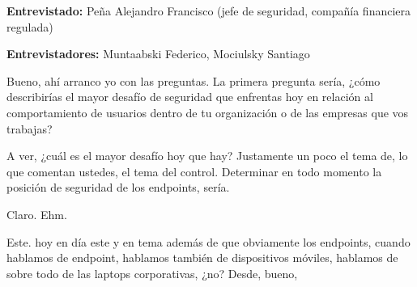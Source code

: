 
\textbf{Entrevistado:} Peña Alejandro Francisco (jefe de seguridad, compañía financiera regulada)

\textbf{Entrevistadores:} Muntaabski Federico, Mociulsky Santiago

\begin{description}[leftmargin=0cm, labelsep=0.5cm]
    \item[\textbf{MUNTAABSKI FEDERICO:}] Bueno, ahí arranco yo con las preguntas. La primera pregunta sería, ¿cómo describirías el mayor desafío de seguridad que enfrentas hoy en relación al comportamiento de usuarios dentro de tu organización o de las empresas que vos trabajas?

    \item[\textbf{PEÑA ALEJANDRO FRANCISCO:}] A ver, ¿cuál es el mayor desafío hoy que hay? Justamente un poco el tema de, lo que comentan ustedes, el tema del control. Determinar en todo momento la posición de seguridad de los endpoints, sería.

    \item[\textbf{MUNTAABSKI FEDERICO:}] Claro. Ehm.

    \item[\textbf{PEÑA ALEJANDRO FRANCISCO:}] Este. hoy en día este y en tema además de que obviamente los endpoints, cuando hablamos de endpoint, hablamos también de dispositivos móviles, hablamos de sobre todo de las laptops corporativas, ¿no? Desde, bueno,


\end{description}
